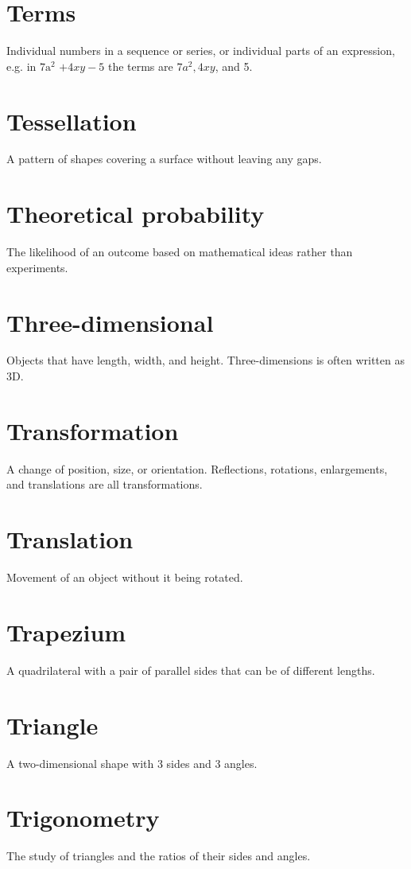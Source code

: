 \documentclass[10pt]{article}
\begin{document}
\section*{Terms}
Individual numbers in a sequence or series, or individual parts of an expression, e.g. in $7 \mathrm{a}^{2}$ $+4 x y-5$ the terms are $7 a^{2}, 4 x y$, and 5.

\section*{Tessellation}
A pattern of shapes covering a surface without leaving any gaps.

\section*{Theoretical probability}
The likelihood of an outcome based on mathematical ideas rather than experiments.

\section*{Three-dimensional}
Objects that have length, width, and height. Three-dimensions is often written as 3D.

\section*{Transformation}
A change of position, size, or orientation. Reflections, rotations, enlargements, and translations are all transformations.

\section*{Translation}
Movement of an object without it being rotated.

\section*{Trapezium}
A quadrilateral with a pair of parallel sides that can be of different lengths.

\section*{Triangle}
A two-dimensional shape with 3 sides and 3 angles.

\section*{Trigonometry}
The study of triangles and the ratios of their sides and angles.
\end{document}
